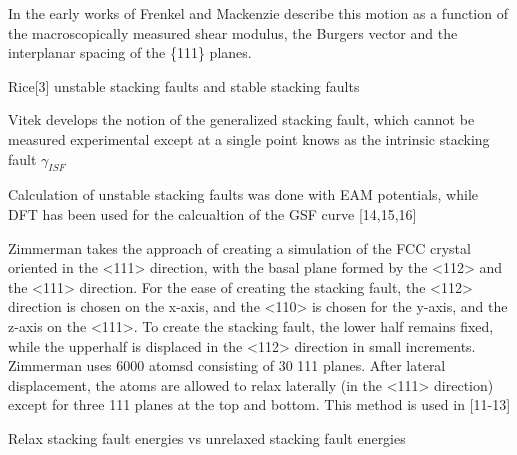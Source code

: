 In the early works of Frenkel and Mackenzie describe this motion as a function of the macroscopically measured shear modulus, the Burgers vector and the interplanar spacing of the \{111\} planes.

Rice[3] unstable stacking faults and stable stacking faults

Vitek\cite{vitek1966_gsf,vitek1968_gsf} develops the notion of the generalized stacking fault, which cannot be measured experimental except at a single point knows as the intrinsic stacking fault $\gamma_{ISF}$

Calculation of unstable stacking faults\cite{sun1990_eam_esf,sun1993_eam_esf,farkas1997_eam_usf} was done with EAM potentials, while DFT has been used for the calcualtion of the GSF curve [14,15,16]

Zimmerman takes the approach of creating a simulation of the FCC crystal oriented in the <111> direction, with the basal plane formed by the <112> and the <111> direction.  For the ease of creating the stacking fault, the <112> direction is chosen on the x-axis, and the <110> is chosen for the y-axis, and the z-axis on the <111>.  To create the stacking fault, the lower half remains fixed, while the upperhalf is displaced in the <112> direction in small increments.  Zimmerman uses 6000 atomsd consisting of 30 {111} planes.  After lateral displacement, the atoms are allowed to relax laterally (in the <111> direction) except for three {111} planes at the top and bottom.  This method is used in [11-13]

Relax stacking fault energies vs unrelaxed stacking fault energies
